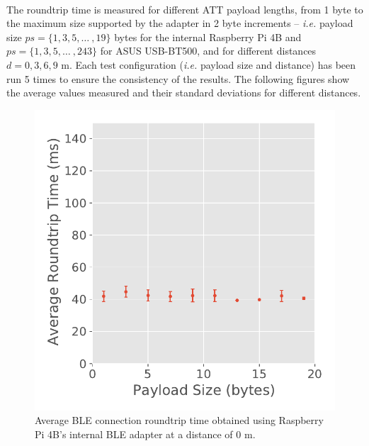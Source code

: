 \paragraph{} The roundtrip time is measured for different \acs{ATT} payload lengths, from 1 byte to the maximum size supported by the adapter in 2 byte increments -- \textit{i.e.} payload size $ps=\{1,3,5,\dots\ , 19\}$ bytes for the internal Raspberry Pi 4B and  $ps=\{1,3,5,\dots\ , 243\}$ for ASUS USB-BT500, and for different distances $d={0,3,6,9}$ m. Each test configuration (\textit{i.e.} payload size and distance) has been run 5 times to ensure the consistency of the results.%
The following figures show the average values measured and their standard deviations for different distances. 

\begin{figure}[H]
    \centering
    \begin{minipage}{0.45\linewidth}
        \centering
        \includegraphics[width=\linewidth]{images/ble-roundtrip-hci1-0cm.pdf}
        \caption[Average \acs{BLE} connection roundtrip time obtained using the Raspberry Pi 4B's internal \acs{BLE} adapter at a distance of 0 m.]{Average \acs{BLE} connection roundtrip time obtained using Raspberry Pi 4B's internal \acs{BLE} adapter at a distance of $0\text{ m}$.}
        \label{fig:ble-roundtrip-hci1-0m}

\end{minipage}
\end{figure}
